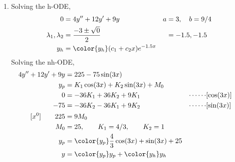 \begin{enumerate}
    \item Solving the h-ODE,
          \begin{align}
              0                        & = 4y'' + 12y' + 9y                      & a & = 3, \quad b = 9/4 \\
              \lambda_{1}, \lambda_{2} & = \frac{-3 \pm \sqrt{0}}{2}             &   & = -1.5, -1.5       \\
              y_{h}                    & = \color{y_h} (c_{1} + c_{2}x)e^{-1.5x}
          \end{align}
          Solving the nh-ODE,
          \begin{align}
              4y'' + 12y' + 9y   & = 225 - 75\sin(3x)                                                            \\
              y_{p}              & = K_{1} \cos(3x) + K_{2} \sin(3x) + M_{0}                                     \\
              0                  & = -36K_{1} + 36K_{2} + 9K_{1}                     & \cdots\cdots & [\cos(3x)] \\
              -75                & = -36K_{2} - 36K_{1} + 9K_{2}                     & \cdots\cdots & [\sin(3x)] \\
              [x^{0}] \qquad 225 & = 9M_{0}                                                                      \\
              M_{0}              & = 25, \qquad K_{1} = 4/3, \qquad K_{2} = 1                                    \\
              y_{p}              & = \color{y_p} \frac{4}{3}\cos(3x) + \sin(3x) + 25                             \\
              y                  & = {\color{y_p} y_{p}} + {\color{y_h} y_{h}}
          \end{align}


\end{enumerate}
